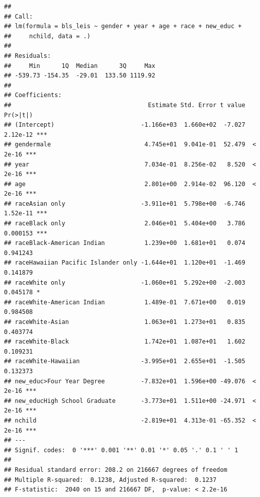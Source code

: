 \documentclass[
]{article}
\begin{document}
\begin{verbatim}
## 
## Call:
## lm(formula = bls_leis ~ gender + year + age + race + new_educ + 
##     nchild, data = .)
## 
## Residuals:
##     Min      1Q  Median      3Q     Max 
## -539.73 -154.35  -29.01  133.50 1119.92 
## 
## Coefficients:
##                                      Estimate Std. Error t value Pr(>|t|)    
## (Intercept)                        -1.166e+03  1.660e+02  -7.027 2.12e-12 ***
## gendermale                          4.745e+01  9.041e-01  52.479  < 2e-16 ***
## year                                7.034e-01  8.256e-02   8.520  < 2e-16 ***
## age                                 2.801e+00  2.914e-02  96.120  < 2e-16 ***
## raceAsian only                     -3.911e+01  5.798e+00  -6.746 1.52e-11 ***
## raceBlack only                      2.046e+01  5.404e+00   3.786 0.000153 ***
## raceBlack-American Indian           1.239e+00  1.681e+01   0.074 0.941243    
## raceHawaiian Pacific Islander only -1.644e+01  1.120e+01  -1.469 0.141879    
## raceWhite only                     -1.060e+01  5.292e+00  -2.003 0.045178 *  
## raceWhite-American Indian           1.489e-01  7.671e+00   0.019 0.984508    
## raceWhite-Asian                     1.063e+01  1.273e+01   0.835 0.403774    
## raceWhite-Black                     1.742e+01  1.087e+01   1.602 0.109231    
## raceWhite-Hawaiian                 -3.995e+01  2.655e+01  -1.505 0.132373    
## new_educ>Four Year Degree          -7.832e+01  1.596e+00 -49.076  < 2e-16 ***
## new_educHigh School Graduate       -3.773e+01  1.511e+00 -24.971  < 2e-16 ***
## nchild                             -2.819e+01  4.313e-01 -65.352  < 2e-16 ***
## ---
## Signif. codes:  0 '***' 0.001 '**' 0.01 '*' 0.05 '.' 0.1 ' ' 1
## 
## Residual standard error: 208.2 on 216667 degrees of freedom
## Multiple R-squared:  0.1238, Adjusted R-squared:  0.1237 
## F-statistic:  2040 on 15 and 216667 DF,  p-value: < 2.2e-16
\end{verbatim}
\end{document}
